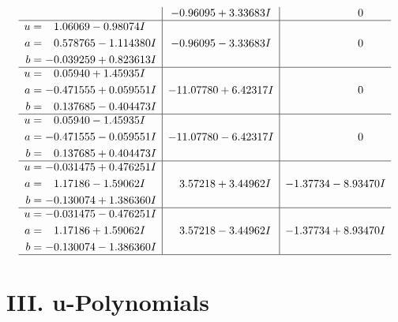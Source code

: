 \documentclass[1p]{elsarticle_modified}
\theoremstyle{definition}
\begin{document}
$$\begin{array}{c|c|c}
 & -0.96095 + 3.33683 I & \phantom{-0.000000 } 0 \\ \hline\begin{aligned}
u &= \phantom{-}1.06069 - 0.98074 I \\
a &= \phantom{-}0.578765 - 1.114380 I \\
b &= -0.039259 + 0.823613 I\end{aligned}
 & -0.96095 - 3.33683 I & \phantom{-0.000000 } 0 \\ \hline\begin{aligned}
u &= \phantom{-}0.05940 + 1.45935 I \\
a &= -0.471555 + 0.059551 I \\
b &= \phantom{-}0.137685 - 0.404473 I\end{aligned}
 & -11.07780 + 6.42317 I & \phantom{-0.000000 } 0 \\ \hline\begin{aligned}
u &= \phantom{-}0.05940 - 1.45935 I \\
a &= -0.471555 - 0.059551 I \\
b &= \phantom{-}0.137685 + 0.404473 I\end{aligned}
 & -11.07780 - 6.42317 I & \phantom{-0.000000 } 0 \\ \hline\begin{aligned}
u &= -0.031475 + 0.476251 I \\
a &= \phantom{-}1.17186 - 1.59062 I \\
b &= -0.130074 + 1.386360 I\end{aligned}
 & \phantom{-}3.57218 + 3.44962 I & -1.37734 - 8.93470 I \\ \hline\begin{aligned}
u &= -0.031475 - 0.476251 I \\
a &= \phantom{-}1.17186 + 1.59062 I \\
b &= -0.130074 - 1.386360 I\end{aligned}
 & \phantom{-}3.57218 - 3.44962 I & -1.37734 + 8.93470 I\\
 \hline 
 \end{array}$$\newpage
\newpage\renewcommand{\arraystretch}{1}
\centering \section*{ III. u-Polynomials}
\end{document}
